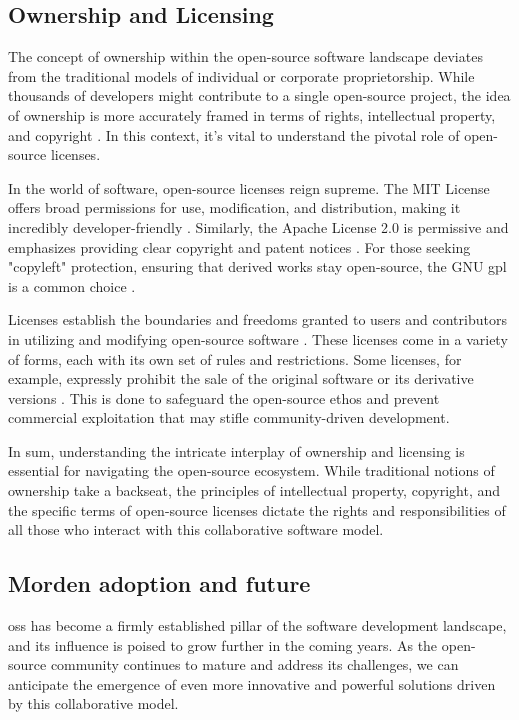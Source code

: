 \subsection{Ownership and Licensing}

The concept of ownership within the open-source software landscape deviates from the traditional models of individual or corporate proprietorship. While thousands of developers might contribute to a single open-source project, the idea of ownership is more accurately framed in terms of rights, intellectual property, and copyright \cite{Codeownership}.  In this context, it's vital to understand the pivotal role of open-source licenses.

In the world of software, open-source licenses reign supreme. The MIT License offers broad permissions for use, modification, and distribution, making it incredibly developer-friendly \cite{saltzer2020origin}. Similarly, the Apache License 2.0 is permissive and emphasizes providing clear copyright and patent notices \cite{sinclair2010license}. For those seeking "copyleft" protection, ensuring that derived works stay open-source, the GNU \ac{gpl} is a common choice \cite{license1989gnu}. 

Licenses establish the boundaries and freedoms granted to users and contributors in utilizing and modifying open-source software \cite{laurent2004understanding}. These licenses come in a variety of forms, each with its own set of rules and restrictions. Some licenses, for example, expressly prohibit the sale of the original software or its derivative versions \cite{madison2003reconstructing}. This is done to safeguard the open-source ethos and prevent commercial exploitation that may stifle community-driven development.

In sum, understanding the intricate interplay of ownership and licensing is essential for navigating the open-source ecosystem. While traditional notions of ownership take a backseat, the principles of intellectual property, copyright, and the specific terms of open-source licenses dictate the rights and responsibilities of all those who interact with this collaborative software model.


\subsection{Morden adoption and future}
\ac{oss} has become a firmly established pillar of the software development landscape, and its influence is poised to grow further in the coming years.  As the open-source community continues to mature and address its challenges, we can anticipate the emergence of even more innovative and powerful solutions driven by this collaborative model.

